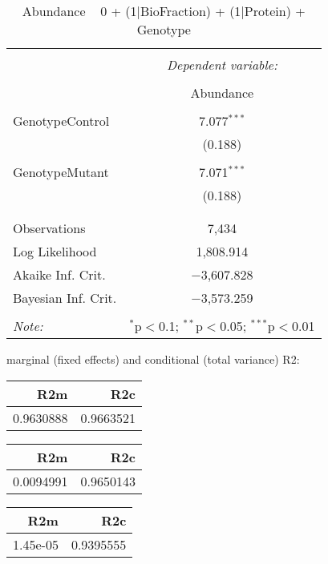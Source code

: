 \documentclass[11pt]{report}
\begin{document}
\begin{table}[!htbp] \centering 
  \caption{Abundance ~ 0 + (1|BioFraction) + (1|Protein) + Genotype} 
  \label{} 
\begin{tabular}{@{\extracolsep{5pt}}lc} 
\\[-1.8ex]\hline 
\hline \\[-1.8ex] 
 & \multicolumn{1}{c}{\textit{Dependent variable:}} \\ 
\cline{2-2} 
\\[-1.8ex] & Abundance \\ 
\hline \\[-1.8ex] 
 GenotypeControl & 7.077$^{***}$ \\ 
  & (0.188) \\ 
  & \\ 
 GenotypeMutant & 7.071$^{***}$ \\ 
  & (0.188) \\ 
  & \\ 
\hline \\[-1.8ex] 
Observations & 7,434 \\ 
Log Likelihood & 1,808.914 \\ 
Akaike Inf. Crit. & $-$3,607.828 \\ 
Bayesian Inf. Crit. & $-$3,573.259 \\ 
\hline 
\hline \\[-1.8ex] 
\textit{Note:}  & \multicolumn{1}{r}{$^{*}$p$<$0.1; $^{**}$p$<$0.05; $^{***}$p$<$0.01} \\ 
\end{tabular} 
\end{table} 
marginal (fixed effects) and conditional (total variance) R2:

\begin{tabular}{r|r}
\hline
R2m & R2c\\
\hline
0.9630888 & 0.9663521\\
\hline
\end{tabular}

\begin{tabular}{r|r}
\hline
R2m & R2c\\
\hline
0.0094991 & 0.9650143\\
\hline
\end{tabular}

\begin{tabular}{r|r}
\hline
R2m & R2c\\
\hline
1.45e-05 & 0.9395555\\
\hline
\end{tabular}
\end{document}

